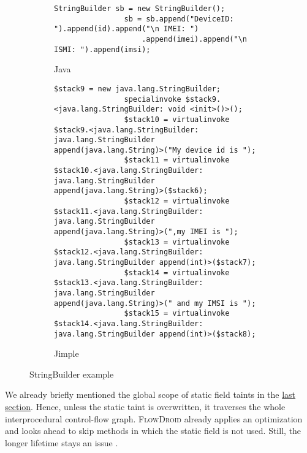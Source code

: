 \documentclass[../draft.tex]{subfiles}
\begin{document}
    \begin{figure}[tbp]
        \centering
        \begin{subfigure}[b]{\textwidth}
            \begin{lstlisting}[gobble=16]
                StringBuilder sb = new StringBuilder();
                sb = sb.append("DeviceID: ").append(id).append("\n IMEI: ")
                    .append(imei).append("\n ISMI: ").append(imsi);
            \end{lstlisting}
            \caption{Java}
        \end{subfigure}
        \qquad
        \begin{subfigure}[b]{\textwidth}
            \begin{lstlisting}[language=Jimple, gobble=16]
                $stack9 = new java.lang.StringBuilder;
                specialinvoke $stack9.<java.lang.StringBuilder: void <init>()>();
                $stack10 = virtualinvoke $stack9.<java.lang.StringBuilder: java.lang.StringBuilder append(java.lang.String)>("My device id is ");
                $stack11 = virtualinvoke $stack10.<java.lang.StringBuilder: java.lang.StringBuilder append(java.lang.String)>($stack6);
                $stack12 = virtualinvoke $stack11.<java.lang.StringBuilder: java.lang.StringBuilder append(java.lang.String)>(",my IMEI is ");
                $stack13 = virtualinvoke $stack12.<java.lang.StringBuilder: java.lang.StringBuilder append(int)>($stack7);
                $stack14 = virtualinvoke $stack13.<java.lang.StringBuilder: java.lang.StringBuilder append(java.lang.String)>(" and my IMSI is ");
                $stack15 = virtualinvoke $stack14.<java.lang.StringBuilder: java.lang.StringBuilder append(int)>($stack8);       
            \end{lstlisting}
            \caption{Jimple}
        \end{subfigure}
        \caption{StringBuilder example}
        \label{lst:stringbuilder}
    \end{figure}

    We already briefly mentioned the global scope of static field taints in the \hyperref[s:rules]{last section}. Hence, unless the static taint is overwritten, it traverses the whole interprocedural control-flow graph. \textsc{FlowDroid} already applies an optimization and looks ahead to skip methods in which the static field is not used. Still, the longer lifetime stays an issue \cite{Arzt2017PhD}.
\end{document}
